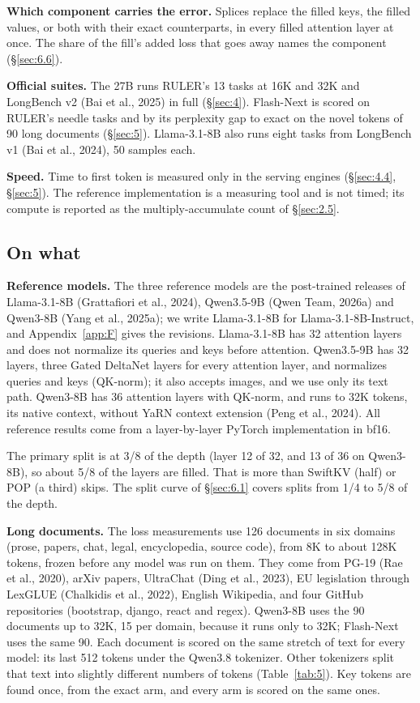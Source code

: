 \documentclass[11pt]{article}
\begin{document}
\textbf{Which component carries the error.} Splices replace the filled keys, the filled values, or both with their exact counterparts, in every filled attention layer at once. The share of the fill's added loss that goes away names the component (\S\ref{sec:6.6}).

\textbf{Official suites.} The 27B runs RULER's 13 tasks at 16K and 32K and LongBench v2 (Bai et al., 2025) in full (\S\ref{sec:4}). Flash-Next is scored on RULER's needle tasks and by its perplexity gap to exact on the novel tokens of 90 long documents (\S\ref{sec:5}). Llama-3.1-8B also runs eight tasks from LongBench v1 (Bai et al., 2024), 50 samples each.

\textbf{Speed.} Time to first token is measured only in the serving engines (\S\ref{sec:4.4}, \S\ref{sec:5}). The reference implementation is a measuring tool and is not timed; its compute is reported as the multiply-accumulate count of \S\ref{sec:2.5}.


\subsection{On what}\label{sec:3.2}
\textbf{Reference models.} The three reference models are the post-trained releases of Llama-3.1-8B (Grattafiori et al., 2024), Qwen3.5-9B (Qwen Team, 2026a) and Qwen3-8B (Yang et al., 2025a); we write Llama-3.1-8B for Llama-3.1-8B-Instruct, and Appendix~\ref{app:F} gives the revisions. Llama-3.1-8B has 32 attention layers and does not normalize its queries and keys before attention. Qwen3.5-9B has 32 layers, three Gated DeltaNet layers for every attention layer, and normalizes queries and keys (QK-norm); it also accepts images, and we use only its text path. Qwen3-8B has 36 attention layers with QK-norm, and runs to 32K tokens, its native context, without YaRN context extension (Peng et al., 2024). All reference results come from a layer-by-layer PyTorch implementation in bf16.

The primary split is at 3/8 of the depth (layer 12 of 32, and 13 of 36 on Qwen3-8B), so about 5/8 of the layers are filled. That is more than SwiftKV (half) or POP (a third) skips. The split curve of \S\ref{sec:6.1} covers splits from 1/4 to 5/8 of the depth.

\textbf{Long documents.} The loss measurements use 126 documents in six domains (prose, papers, chat, legal, encyclopedia, source code), from 8K to about 128K tokens, frozen before any model was run on them. They come from PG-19 (Rae et al., 2020), arXiv papers, UltraChat (Ding et al., 2023), EU legislation through LexGLUE (Chalkidis et al., 2022), English Wikipedia, and four GitHub repositories (bootstrap, django, react and regex). Qwen3-8B uses the 90 documents up to 32K, 15 per domain, because it runs only to 32K; Flash-Next uses the same 90. Each document is scored on the same stretch of text for every model: its last 512 tokens under the Qwen3.8 tokenizer. Other tokenizers split that text into slightly different numbers of tokens (Table~\ref{tab:5}). Key tokens are found once, from the exact arm, and every arm is scored on the same ones.
\end{document}

